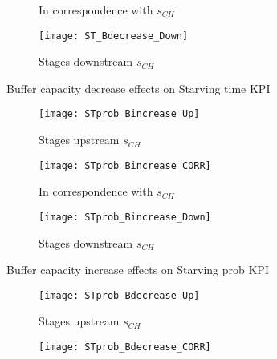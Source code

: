 \begin{landscape}
\begin{figure}[p]
\begin{subfigure}[b]{0.4\textwidth}
    \caption{In correspondence with $s_{CH}$}
    \label{fig:Buffer capacity decrease effects on Starving time KPI - In correspondence with}   
  \end{subfigure}
  \begin{subfigure}[b]{0.4\textwidth}
    \texttt{[image: ST\_Bdecrease\_Down]}
    \caption{Stages downstream $s_{CH}$}
    \label{fig:Buffer capacity decrease effects on Starving time KPI - Stages downstream}   
  \end{subfigure}
  \caption{Buffer capacity decrease effects on Starving time KPI}
  \label{fig:Buffer capacity decrease effects on Starving time KPI}
\end{figure}
\end{landscape}
\begin{landscape}
\begin{figure}[p]
  \centering
  \begin{subfigure}[t]{0.4\textwidth}
    \texttt{[image: STprob\_Bincrease\_Up]}
    \caption{Stages upstream $s_{CH}$}
    \label{fig:Buffer capacity increase effects on Starving prob KPI - Stages upstream}   
  \end{subfigure}
  \begin{subfigure}[t]{0.4\textwidth}
    \texttt{[image: STprob\_Bincrease\_CORR]}
    \caption{In correspondence with $s_{CH}$}
    \label{fig:Buffer capacity increase effects on Starving prob KPI - In correspondence with}   
  \end{subfigure}
  \begin{subfigure}[t]{0.4\textwidth}
    \texttt{[image: STprob\_Bincrease\_Down]}
    \caption{Stages downstream $s_{CH}$}
    \label{fig:Buffer capacity increase effects on Starving prob KPI - Stages downstream}   
  \end{subfigure}
  \caption{Buffer capacity increase effects on Starving prob KPI}
  \label{fig:Buffer capacity increase effects on Starving prob KPI}
\end{figure}
\begin{figure}[p]
  \centering
  \begin{subfigure}[b]{0.4\textwidth}
    \texttt{[image: STprob\_Bdecrease\_Up]}
    \caption{Stages upstream $s_{CH}$}
    \label{fig:Buffer capacity decrease effects on Starving prob KPI - Stages upstream}   
  \end{subfigure}
  \begin{subfigure}[b]{0.4\textwidth}
    \texttt{[image: STprob\_Bdecrease\_CORR]}

\end{subfigure}
\end{figure}
\end{landscape}
